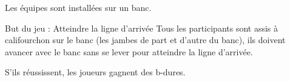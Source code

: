 \documentclass{grand-jeu}
\begin{document}
\begin{liste-materiel}
\end{liste-materiel}

\begin{installation}
Les équipes sont installées sur un banc.
\end{installation}

\begin{regles}

But du jeu : Atteindre la ligne d’arrivée
Tous les participants sont assis à califourchon sur le banc (les jambes de part et d’autre du banc), ils doivent avancer avec le banc sans se lever pour atteindre la ligne d’arrivée.


S'ils réussissent, les joueurs gagnent des b-dures. 

\end{regles}

\begin{imaginaire}

\end{imaginaire}

\begin{moments-stop}
\end{moments-stop}
\end{document}
